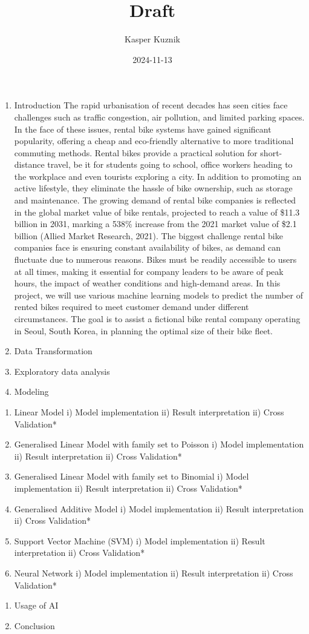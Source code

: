 \documentclass[
]{article}
\title{Draft}
\author{Kasper Kuznik}
\date{2024-11-13}
\begin{document}
\maketitle

\begin{enumerate}
\def\labelenumi{\arabic{enumi}.}
\item
  Introduction The rapid urbanisation of recent decades has seen cities
  face challenges such as traffic congestion, air pollution, and limited
  parking spaces. In the face of these issues, rental bike systems have
  gained significant popularity, offering a cheap and eco-friendly
  alternative to more traditional commuting methods. Rental bikes
  provide a practical solution for short-distance travel, be it for
  students going to school, office workers heading to the workplace and
  even tourists exploring a city. In addition to promoting an active
  lifestyle, they eliminate the hassle of bike ownership, such as
  storage and maintenance. The growing demand of rental bike companies
  is reflected in the global market value of bike rentals, projected to
  reach a value of \$11.3 billion in 2031, marking a 538\% increase from
  the 2021 market value of \$2.1 billion (Allied Market Research, 2021).
  The biggest challenge rental bike companies face is ensuring constant
  availability of bikes, as demand can fluctuate due to numerous
  reasons. Bikes must be readily accessible to users at all times,
  making it essential for company leaders to be aware of peak hours, the
  impact of weather conditions and high-demand areas. In this project,
  we will use various machine learning models to predict the number of
  rented bikes required to meet customer demand under different
  circumstances. The goal is to assist a fictional bike rental company
  operating in Seoul, South Korea, in planning the optimal size of their
  bike fleet.
\item
  Data Transformation
\item
  Exploratory data analysis
\item
  Modeling
\end{enumerate}

\begin{enumerate}
\def\labelenumi{\alph{enumi})}
\item
  Linear Model i) Model implementation ii) Result interpretation ii)
  Cross Validation*
\item
  Generalised Linear Model with family set to Poisson i) Model
  implementation ii) Result interpretation ii) Cross Validation*
\item
  Generalised Linear Model with family set to Binomial i) Model
  implementation ii) Result interpretation ii) Cross Validation*
\item
  Generalised Additive Model i) Model implementation ii) Result
  interpretation ii) Cross Validation*
\item
  Support Vector Machine (SVM) i) Model implementation ii) Result
  interpretation ii) Cross Validation*
\item
  Neural Network i) Model implementation ii) Result interpretation ii)
  Cross Validation*
\end{enumerate}

\begin{enumerate}
\def\labelenumi{\arabic{enumi}.}
\setcounter{enumi}{4}
\item
  Usage of AI
\item
  Conclusion
\end{enumerate}
\end{document}
